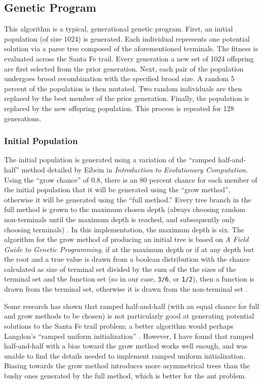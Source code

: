 \documentclass{acm_proc_article-sp}
\begin{document}
\subsection{Genetic Program}
This algorithm is a typical, generational genetic program. First, an
initial population (of size 1024) is generated. Each individual
represents one potential solution via a parse tree composed of the
aforementioned terminals. The fitness is evaluated across the Santa Fe
trail. Every generation a new set of 1024 offspring are first selected
from the prior generation. Next, each pair of the population undergoes
brood recombination with the specified brood size. A random 5 percent
of the population is then mutated. Two random individuals are then
replaced by the best member of the prior generation. Finally, the
population is replaced by the new offspring population. This process
is repeated for 128 generations.

\subsubsection{Initial Population}
The initial population is generated using a variation of the ``ramped
half-and-half'' method detailed by Eibein in \emph{Introduction to
  Evolutionary Computation}. Using the ``grow chance'' of 0.8, there
is an 80 percent chance for each member of the initial population that
it will be generated using the ``grow method'', otherwise it will be
generated using the ``full method.'' Every tree branch in the full
method is grown to the maximum chosen depth (always choosing random
non-terminals until the maximum depth is reached, and subsequently
only choosing terminals) \cite{Eiben:Evo}. In this implementation, the
maximum depth is six. The algorithm for the grow method of producing
an initial tree is based on \emph{A Field Guide to Genetic
  Programming}, if at the maximum depth or if at any depth but the
root and a true value is drawn from a boolean distribution with the
chance calculated as size of terminal set divided by the sum of the
the sizes of the terminal set and the function set (so in our case,
\texttt{3/6}, or \texttt{1/2}), then a function is drawn from the
terminal set, otherwise it is drawn from the non-terminal set
\cite{Poli:Field}.

Some research has shown that ramped half-and-half (with an equal
chance for full and grow methods to be chosen) is not particularly
good at generating potential solutions to the Santa Fe trail problem;
a better algorithm would perhaps Langdon's ``ramped uniform
initialization'' \cite{Poli:Field}. However, I have found that ramped
half-and-half with a bias toward the grow method works well enough,
and was unable to find the details needed to implement ramped uniform
initialization. Biasing towards the grow method introduces more
asymmetrical trees than the bushy ones generated by the full method,
which is better for the ant problem.
\end{document}
